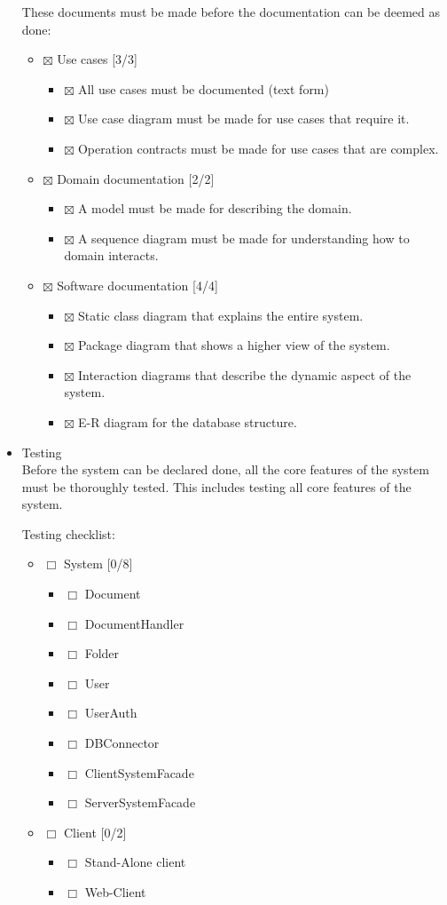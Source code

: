 \documentclass[11pt]{article}
\begin{document}
\begin{itemize}
These documents must be made before the documentation can be deemed as done:
\begin{itemize}
\item $\boxtimes$ Use cases [3/3]
\begin{itemize}
\item $\boxtimes$ All use cases must be documented (text form)
\item $\boxtimes$ Use case diagram must be made for use cases that require it.
\item $\boxtimes$ Operation contracts must be made for use cases that are complex.
\end{itemize}
\item $\boxtimes$ Domain documentation [2/2]
\begin{itemize}
\item $\boxtimes$ A model must be made for describing the domain.
\item $\boxtimes$ A sequence diagram must be made for understanding how to domain
       interacts.
\end{itemize}
\item $\boxtimes$ Software documentation [4/4]
\begin{itemize}
\item $\boxtimes$ Static class diagram that explains the entire system.
\item $\boxtimes$ Package diagram that shows a higher view of the system.
\item $\boxtimes$ Interaction diagrams that describe the dynamic aspect of the system.
\item $\boxtimes$ E-R diagram for the database structure.
\end{itemize}
\end{itemize}


\item Testing\\
\label{sec-5-1-1-3}%
Before the system can be declared done, all the core features of the system
must be thoroughly tested.
This includes testing all core features of the system.

Testing checklist:
\begin{itemize}
\item $\Box$ System [0/8]
\begin{itemize}
\item $\Box$ Document
\item $\Box$ DocumentHandler
\item $\Box$ Folder
\item $\Box$ User
\item $\Box$ UserAuth
\item $\Box$ DBConnector
\item $\Box$ ClientSystemFacade
\item $\Box$ ServerSystemFacade
\end{itemize}
\item $\Box$ Client [0/2]
\begin{itemize}
\item $\Box$ Stand-Alone client
\item $\Box$ Web-Client
\end{itemize}
\end{itemize}


\end{itemize}
\end{document}
